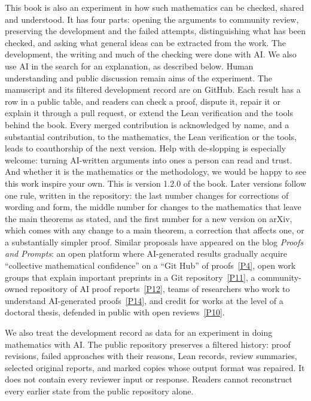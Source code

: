 This book is also an experiment in how such mathematics can be checked,
shared and understood. It has four parts: opening the arguments to community
review, preserving the development and the failed attempts, distinguishing what
has been checked, and asking what general ideas can be extracted from the work.
The development, the writing and much of the checking were done with AI. We also
use AI in the search for an explanation, as described below. Human understanding
and public discussion remain aims of the experiment. The manuscript and its
filtered development record are on GitHub. Each result has a row in a public
table, and readers can check a proof, dispute it, repair it or explain it
through a pull request, or extend the Lean verification and the tools behind the
book. Every merged contribution is acknowledged by name, and a substantial
contribution, to the mathematics, the Lean verification or the tools, leads to
coauthorship of the next version.
Help with \mbox{de-slopping} is especially welcome: turning AI-written
arguments into ones a person can read and trust. And whether it is the
mathematics or the methodology, we would be happy to see this work inspire your
own. This is
version 1.2.0 of the book. Later versions follow one rule, written in the
repository: the last number changes for corrections of wording and form, the
middle number for changes to the mathematics that leave the main theorems as
stated, and the first number for a new version on arXiv, which comes with any
change to a main theorem, a correction that affects one, or a substantially
simpler proof. Similar proposals have
appeared on the blog \emph{Proofs and Prompts}: an open platform where
AI-generated results gradually acquire ``collective mathematical confidence''
on a ``Git Hub'' of proofs~\hyperlink{pp:P4}{[P4]}, open work groups that
explain important preprints in a Git repository~\hyperlink{pp:P11}{[P11]}, a
community-owned repository of AI proof reports~\hyperlink{pp:P12}{[P12]}, teams
of researchers who work to understand AI-generated
proofs~\hyperlink{pp:P14}{[P14]}, and credit for works at the level of a
doctoral thesis, defended in public with open reviews~\hyperlink{pp:P10}{[P10]}.

We also treat the development record as data for an experiment in doing
mathematics with AI. The public repository preserves a filtered history:
proof revisions, failed approaches with their reasons, Lean records, review
summaries, selected original reports, and marked copies whose output format
was repaired. It does not contain every reviewer input or response. Readers
cannot reconstruct every earlier state from the public repository alone.

